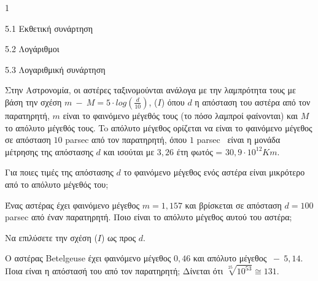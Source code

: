 \begin{ylh}{1}
\item 5.1 Εκθετική συνάρτηση
\item 5.2 Λογάριθμοι
\item 5.3 Λογαριθμική συνάρτηση
\end{ylh}
Στην Αστρονομία, οι αστέρες ταξινομούνται ανάλογα με την λαμπρότητα τους με βάση την σχέση $m\  - \ M = 5 \cdot log\left( \frac{d}{10} \right)$, ($I$) όπου $d$ η απόσταση του αστέρα από τον παρατηρητή, $m$ είναι το φαινόμενο μέγεθός τους (το πόσο λαμπροί φαίνονται) και $Μ$ το απόλυτο μέγεθός τους. To απόλυτο μέγεθος ορίζεται να είναι το φαινόμενο μέγεθος σε απόσταση $10$ parsec από τον παρατηρητή, όπου $1$ parsec~ είναι η μονάδα μέτρησης της απόστασης $d$ και ισούται με $3,26$ έτη φωτός = $30,9 \cdot 10^{12}Km$.
\begin{alist}
\item Για ποιες τιμές της απόστασης $d$ το φαινόμενο μέγεθος ενός αστέρα είναι μικρότερο από το απόλυτο μέγεθός του;
\item Ένας αστέρας έχει φαινόμενο μέγεθος $m = 1,157$ και βρίσκεται σε απόσταση $d = 100$ parsec από έναν παρατηρητή. Ποιο είναι το απόλυτο μέγεθος αυτού του αστέρα;
\item Να επιλύσετε την σχέση ($I$) ως προς $d$.
\item Ο αστέρας Betelgeuse έχει φαινόμενο μέγεθος $0,46$ και απόλυτο μέγεθος $\  - \ 5,14$. Ποια είναι η απόστασή του από τον παρατηρητή; Δίνεται ότι $\sqrt[25]{10^{53}} \cong 131$.
\end{alist}


